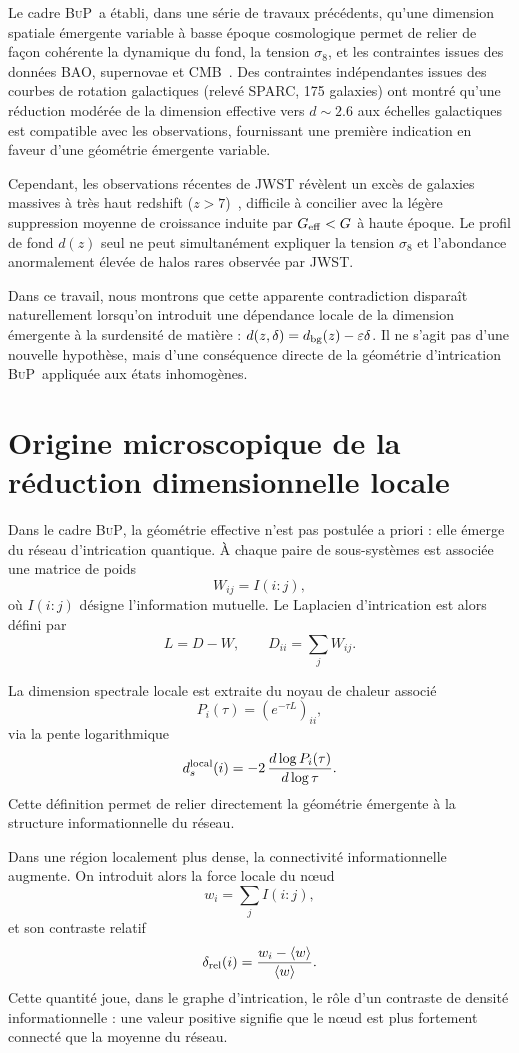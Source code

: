 \documentclass[11pt]{article}
\newcommand{\Geff}{G_{\rm eff}}
\newcommand{\sig}{\sigma_8}
\newcommand{\BuP}{\textsc{BuP}}
\begin{document}
Le cadre \BuP\ a établi, dans une série de travaux précédents, qu'une dimension spatiale émergente variable à basse époque cosmologique permet de relier de façon cohérente la dynamique du fond, la tension $\sig$, et les contraintes issues des données BAO, supernovae et CMB~\cite{hamdad2026bup}.
Des contraintes indépendantes issues des courbes de rotation galactiques (relevé SPARC, 175 galaxies) ont montré qu'une réduction modérée de la dimension effective vers $d \sim 2.6$ aux échelles galactiques est compatible avec les observations, fournissant une première indication en faveur d'une géométrie émergente variable.

Cependant, les observations récentes de JWST révèlent un excès de galaxies massives à très haut redshift ($z>7$)~\cite{labbe2023,finkelstein2023}, difficile à concilier avec la légère suppression moyenne de croissance induite par $\Geff < G$ à haute époque.
Le profil de fond $d(z)$ seul ne peut simultanément expliquer la tension $\sig$ et l'abondance anormalement élevée de halos rares observée par JWST.

Dans ce travail, nous montrons que cette apparente contradiction disparaît naturellement lorsqu'on introduit une dépendance locale de la dimension émergente à la surdensité de matière : $d(z,\delta) = d_{\rm bg}(z) - \varepsilon\delta$.
Il ne s'agit pas d'une nouvelle hypothèse, mais d'une conséquence directe de la géométrie d'intrication \BuP\ appliquée aux états inhomogènes.

\section{Origine microscopique de la réduction dimensionnelle locale}
\label{sec:micro}

Dans le cadre \BuP, la géométrie effective n'est pas postulée a priori : elle émerge du réseau d'intrication quantique.
À chaque paire de sous-systèmes est associée une matrice de poids
\[
W_{ij}=I(i:j),
\]
où $I(i:j)$ désigne l'information mutuelle.
Le Laplacien d'intrication est alors défini par
\[
L = D - W,
\qquad
D_{ii}=\sum_j W_{ij}.
\]

La dimension spectrale locale est extraite du noyau de chaleur associé
\[
P_i(\tau)=\left(e^{-\tau L}\right)_{ii},
\]
via la pente logarithmique
\[
d_s^{\rm local}(i) = -2\,\frac{d\log P_i(\tau)}{d\log \tau}.
\]
Cette définition permet de relier directement la géométrie émergente à la structure informationnelle du réseau.

Dans une région localement plus dense, la connectivité informationnelle augmente.
On introduit alors la force locale du nœud
\[
w_i = \sum_j I(i:j),
\]
et son contraste relatif
\[
\delta_{\rm rel}(i) = \frac{w_i - \langle w \rangle}{\langle w \rangle}.
\]
Cette quantité joue, dans le graphe d'intrication, le rôle d'un contraste de densité informationnelle : une valeur positive signifie que le nœud est plus fortement connecté que la moyenne du réseau.
\end{document}
